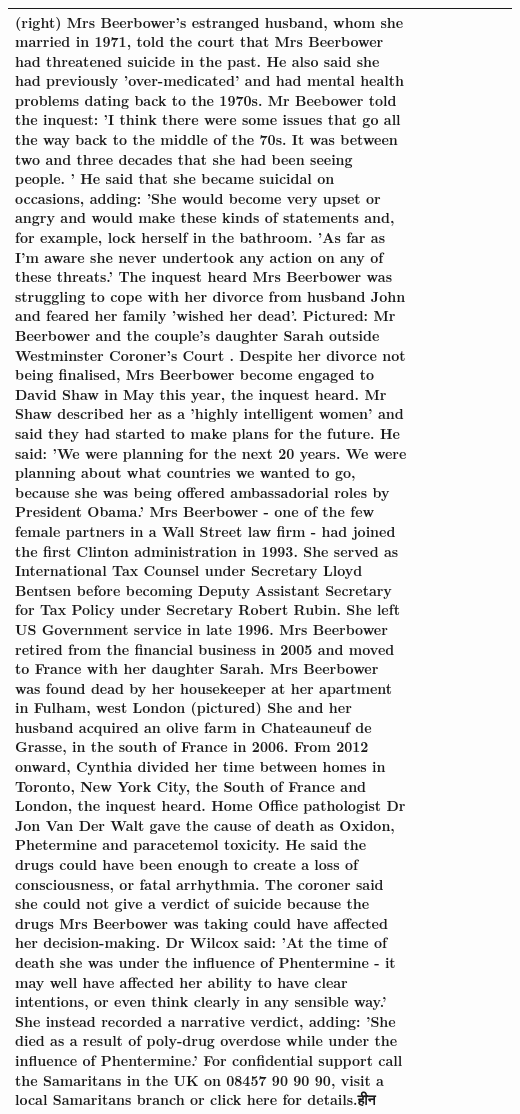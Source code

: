 \begin{table}[H]
\begin{tabular}{llrlllll}
(right) Mrs Beerbower's estranged husband, whom she married in 1971, told the court that Mrs Beerbower had threatened suicide in the past. He also said she had previously 'over-medicated' and had mental health problems dating back to the 1970s. Mr Beebower told the inquest: 'I think there were some issues that go all the way back to the middle of the 70s. It was between two and three decades that she had been seeing people. ' He said that she became suicidal on occasions, adding: 'She would become very upset or angry and would make these kinds of statements and, for example, lock herself in the bathroom. 'As far as I'm aware she never undertook any action on any of these threats.' The inquest heard Mrs Beerbower was struggling to cope with her divorce from husband John and feared her family 'wished her dead'. Pictured: Mr Beerbower and the couple's daughter Sarah outside Westminster Coroner's Court . Despite her divorce not being finalised, Mrs Beerbower become engaged to David Shaw in May this year, the inquest heard. Mr Shaw described her as a 'highly intelligent women' and said they had started to make plans for the future. He said: 'We were planning for the next 20 years. We were planning about what countries we wanted to go, because she was being offered ambassadorial roles by President Obama.' Mrs Beerbower - one of the few female partners in a Wall Street law firm - had joined the first Clinton administration in 1993. She served as International Tax Counsel under Secretary Lloyd Bentsen before becoming Deputy Assistant Secretary for Tax Policy under Secretary Robert Rubin. She left US Government service in late 1996. Mrs Beerbower retired from the financial business in 2005 and moved to France with her daughter Sarah. Mrs Beerbower was found dead by her housekeeper at her apartment in Fulham, west London (pictured) She and her husband acquired an olive farm in Chateauneuf de Grasse, in the south of France in 2006. From 2012 onward, Cynthia divided her time between homes in Toronto, New York City, the South of France and London, the inquest heard. Home Office pathologist Dr Jon Van Der Walt gave the cause of death as Oxidon, Phetermine and paracetemol toxicity. He said the drugs could have been enough to create a loss of consciousness, or fatal arrhythmia. The coroner said she could not give a verdict of suicide because the drugs Mrs Beerbower was taking could have affected her decision-making. Dr Wilcox said: 'At the time of death she was under the influence of Phentermine - it may well have affected her ability to have clear intentions, or even think clearly in any sensible way.' She instead recorded a narrative verdict, adding: 'She died as a result of poly-drug overdose while under the influence of Phentermine.' For confidential support call the Samaritans in the UK on 08457 90 90 90, visit a local Samaritans branch or click here for details.हीन \\
\bottomrule
\end{tabular}
\end{table}
